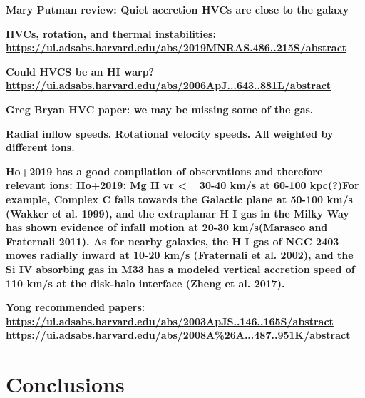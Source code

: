 \documentclass[fleqn,usenatbib]{mnras}
\begin{document}
\textbf{Mary Putman review:
Quiet accretion
HVCs are close to the galaxy}

\textbf{HVCs, rotation, and thermal instabilities:
\url{https://ui.adsabs.harvard.edu/abs/2019MNRAS.486..215S/abstract}
}

\textbf{
Could HVCS be an HI warp?
\url{https://ui.adsabs.harvard.edu/abs/2006ApJ...643..881L/abstract}
}

\textbf{
Greg Bryan HVC paper:
we may be missing some of the gas.
}

\textbf{
Radial inflow speeds.
Rotational velocity speeds.
All weighted by different ions.
}

\textbf{
Ho+2019 has a good compilation of observations and therefore relevant ions:
Ho+2019:
Mg II vr <= 30-40 km/s at 60-100 kpc(?)For example, Complex C falls towards the Galactic plane at 50-100 km/s (Wakker et al. 1999), and the extraplanar H I gas in the Milky Way has shown evidence of infall motion at 20-30 km/s(Marasco and Fraternali 2011).
As for nearby galaxies, the H I gas of NGC 2403 moves radially inward at 10-20 km/s (Fraternali et al. 2002), and the Si IV absorbing gas in M33 has a modeled vertical accretion speed of 110 km/s at the disk-halo interface (Zheng et al. 2017).
}

\textbf{
Yong recommended papers:
\url{https://ui.adsabs.harvard.edu/abs/2003ApJS..146..165S/abstract}
\url{https://ui.adsabs.harvard.edu/abs/2008A\%26A...487..951K/abstract}
}

\section{Conclusions}
\label{s: conclusions}
\end{document}
